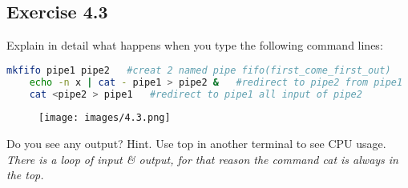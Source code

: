 \documentclass[12pt, titlepage,]{article}
\begin{document}
\subsection{Exercise 4.3} 
Explain in detail what happens when you type the following command lines: 
     \begin{lstlisting}[language=Bash]
    mkfifo pipe1 pipe2   #creat 2 named pipe fifo(first_come_first_out)
    echo -n x | cat - pipe1 > pipe2 &   #redirect to pipe2 from pipe1
    cat <pipe2 > pipe1   #redirect to pipe1 all input of pipe2
    \end{lstlisting}

    \begin{figure}[h] %
    \centering
    {\texttt{[image: images/4.3.png]}}
    \end{figure} 

Do you see any output? Hint. Use top in another terminal to see CPU usage. \\
{\textit{\color{blue} There is a loop of input \& output, for that reason the command cat is
    always in the top.}}
\clearpage
 
\end{document}
